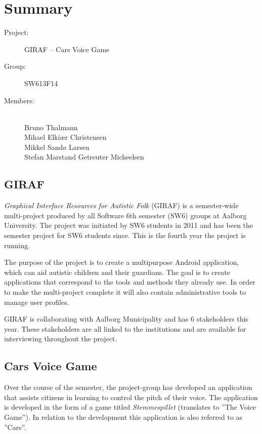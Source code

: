 \documentclass[a4paper,12pt,english]{article}
\begin{document}
\section*{\Huge Summary}

\begin{description}
\item[Project:] GIRAF -- Cars Voice Game
\item[Group:] SW613F14
\item[Members:] ~ \\
	Bruno Thalmann \\
	Mikael Elki\ae r Christensen \\
	Mikkel Sand\o{} Larsen \\
	Stefan Marstand Getreuter Micheelsen
\end{description}

\subsection*{GIRAF}
\textit{Graphical Interface Resources for Autistic Folk} (GIRAF) is a semester-wide multi-project produced by all Software 6th semester (SW6) groups at Aalborg University.
The project was initiated by SW6 students in 2011 and has been the semester project for SW6 students since.
This is the fourth year the project is running.

The purpose of the project is to create a multipurpose Android application, which can aid autistic children and their guardians.
The goal is to create applications that correspond to the tools and methods they already use.
In order to make the multi-project complete it will also contain administrative tools to manage user profiles.

GIRAF is collaborating with Aalborg Municipality and has 6 stakeholders this year.
These stakeholders are all linked to the institutions and are available for interviewing throughout the project.

\subsection*{Cars Voice Game}
Over the course of the semester, the project-group has developed an application that assists citizens in learning to control the pitch of their voice.
The application is developed in the form of a game titled \textit{Stemmespillet} (translates to ''The Voice Game'').
In relation to the development this application is also referred to as ''Cars''.
\end{document}
